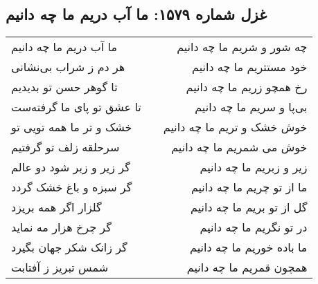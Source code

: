 \begin{center}
\section*{غزل شماره ۱۵۷۹: ما آب دریم ما چه دانیم}
\label{sec:1579}
\begin{longtable}{l p{0.5cm} r}
ما آب دریم ما چه دانیم
&&
چه شور و شریم ما چه دانیم
\\
هر دم ز شراب بی‌نشانی
&&
خود مستتریم ما چه دانیم
\\
تا گوهر حسن تو بدیدیم
&&
رخ همچو زریم ما چه دانیم
\\
تا عشق تو پای ما گرفته‌ست
&&
بی‌پا و سریم ما چه دانیم
\\
خشک و تر ما همه تویی تو
&&
خوش خشک و تریم ما چه دانیم
\\
سرحلقه زلف تو گرفتیم
&&
خوش می شمریم ما چه دانیم
\\
گر زیر و زبر شود دو عالم
&&
زیر و زبریم ما چه دانیم
\\
گر سبزه و باغ خشک گردد
&&
ما از تو چریم ما چه دانیم
\\
گلزار اگر همه بریزد
&&
گل از تو بریم ما چه دانیم
\\
گر چرخ هزار مه نماید
&&
در تو نگریم ما چه دانیم
\\
گر زانک شکر جهان بگیرد
&&
ما باده خوریم ما چه دانیم
\\
شمس تبریز ز آفتابت
&&
همچون قمریم ما چه دانیم
\\
\end{longtable}
\end{center}
